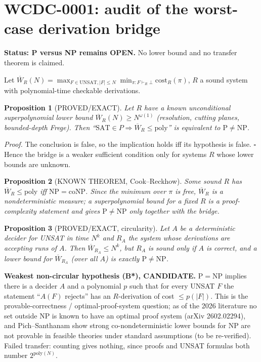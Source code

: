 \documentclass{article}
\newtheorem{prop}{Proposition}
\begin{document}
\section*{WCDC-0001: audit of the worst-case derivation bridge}
\textbf{Status: P versus NP remains OPEN.} No lower bound and no transfer theorem is claimed.

Let $\overline W_R(N)=\max_{F\in\mathrm{UNSAT},|F|\le N}\min_{\pi:F\vdash_R\bot}\mathrm{cost}_R(\pi)$, $R$ a sound system with polynomial-time checkable derivations.

\begin{prop}[PROVED/EXACT] Let $R$ have a known unconditional superpolynomial lower bound $\overline W_R(N)\ge N^{\omega(1)}$ (resolution, cutting planes, bounded-depth Frege). Then ``$\mathrm{SAT}\in P\Rightarrow \overline W_R\le\mathrm{poly}$'' is equivalent to $\mathrm{P}\ne\mathrm{NP}$.\end{prop}
\emph{Proof.} The conclusion is false, so the implication holds iff its hypothesis is false. $\square$
Hence the bridge is a weaker sufficient condition only for systems $R$ whose lower bounds are unknown.

\begin{prop}[KNOWN THEOREM, Cook--Reckhow] Some sound $R$ has $\overline W_R\le\mathrm{poly}$ iff $\mathrm{NP}=\mathrm{coNP}$. Since the minimum over $\pi$ is free, $\overline W_R$ is a nondeterministic measure; a superpolynomial bound for a fixed $R$ is a proof-complexity statement and gives $\mathrm P\neq\mathrm{NP}$ only together with the bridge.\end{prop}

\begin{prop}[PROVED/EXACT, circularity] Let $A$ be a deterministic decider for UNSAT in time $N^k$ and $R_A$ the system whose derivations are accepting runs of $A$. Then $\overline W_{R_A}\le N^k$, but $R_A$ is sound only if $A$ is correct, and a lower bound for $\overline W_{R_A}$ (over all $A$) is exactly $\mathrm P\ne\mathrm{NP}$.\end{prop}

\textbf{Weakest non-circular hypothesis (B*), CANDIDATE.} $\mathrm P=\mathrm{NP}$ implies there is a decider $A$ and a polynomial $p$ such that for every UNSAT $F$ the statement ``$A(F)$ rejects'' has an $R$-derivation of cost $\le p(|F|)$. This is the provable-correctness / optimal-proof-system question; as of the 2026 literature no set outside NP is known to have an optimal proof system (arXiv 2602.02294), and Pich--Santhanam show strong co-nondeterministic lower bounds for NP are not provable in feasible theories under standard assumptions (to be re-verified). Failed transfer: counting gives nothing, since proofs and UNSAT formulas both number $2^{\mathrm{poly}(N)}$.
\end{document}
